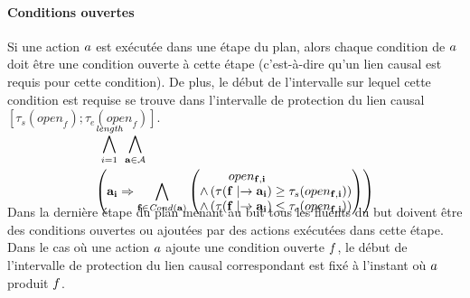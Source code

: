 

\paragraph*{Conditions ouvertes} Si une action $a$ est exécutée dans une étape du plan, alors chaque condition de $a$ doit être une condition ouverte à cette étape (c'est-à-dire qu'un lien causal est requis pour cette condition). De plus, le début de l'intervalle sur lequel cette condition est requise se trouve dans l'intervalle de protection du lien causal $[\tau_{s}(\textit{open}_{f});\tau_{e}(\textit{open}_{f})]$.

\begin{small}
\begin{multline*}
~\\[-3em]
\BigforallTwo{i=1}{\length}\bigwedge\limits_{\substack{\mathbf{\a}\in \mathbf{\A}}}\hfill\\
\left(\mathbf{\a}_{\mathbf{i}} \Rightarrow \bigwedge\limits_{\substack{\mathbf{f}\in \cond{\mathbf{\a}}}}\begin{pmatrix}open_{\mathbf{\f},\mathbf{i}}\hfill\\ \wedge \left(\tau(\mathbf{\f}\mid\rightarrow\mathbf{\a}_\mathbf{i}) \geq \tau_{s}(open_{\mathbf{f},\mathbf{i}})\right)\hfill\\
 \wedge \left(\tau(\mathbf{\f}\mid\rightarrow\mathbf{\a}_\mathbf{i}) \leq \tau_{e}(open_{\mathbf{\f},\mathbf{i}})\right)\end{pmatrix}\right)\hfill\\[-2em]
\end{multline*}
\end{small}

Dans la dernière étape du plan menant au but tous les fluents du but doivent être des conditions ouvertes ou ajoutées par des actions exécutées dans cette étape. Dans le cas où une action $a$ ajoute une condition ouverte $f$, le début de l'intervalle de protection du lien causal correspondant est fixé à l'instant où $a$ produit $f$.

